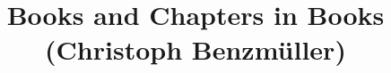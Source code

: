 \documentclass{article}
\begin{document}
\title{Books and Chapters in Books (Christoph Benzm{\"u}ller)}
\maketitle
\nocite{*}


\end{document}
